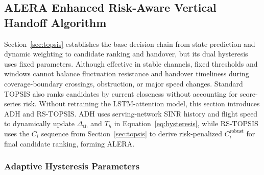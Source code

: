 \documentclass[remotesensing,article,submit,moreauthors]{Definitions/mdpi}
\begin{document}
\subsection{ALERA Enhanced Risk-Aware Vertical Handoff Algorithm}\label{sec:alera}

Section~\ref{sec:topsis} establishes the base decision chain from state prediction and dynamic weighting to candidate ranking and handover, but its dual hysteresis uses fixed parameters. Although effective in stable channels, fixed thresholds and windows cannot balance fluctuation resistance and handover timeliness during coverage-boundary crossings, obstruction, or major speed changes. Standard TOPSIS also ranks candidates by current closeness without accounting for score-series risk. Without retraining the LSTM-attention model, this section introduces ADH and RS-TOPSIS. ADH uses serving-network SINR history and flight speed to dynamically update $\Delta_{\mathrm{th}}$ and $T_h$ in Equation~\eqref{eq:hysteresis}, while RS-TOPSIS uses the $C_i$ sequence from Section~\ref{sec:topsis} to derive risk-penalized $C_i^{\mathrm{robust}}$ for final candidate ranking, forming ALERA.

\subsubsection{Adaptive Hysteresis Parameters}\label{sec:adh}
\end{document}
